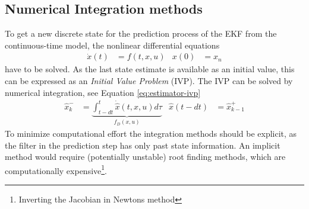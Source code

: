 \subsection{Numerical Integration methods}
\label{sec:numerical-integration}
To get a new discrete state for the prediction process of the EKF from the continuous-time model, the nonlinear differential equations 
\begin{align}
    \dot x(t) &= f(t, x, u) & x(0) &= x_{n} 
\end{align}
have to be solved. 
As the last state estimate is available as an initial value, this can be expressed as an \textit{Initial Value Problem} (IVP). 
The IVP can be solved by numerical integration, see Equation \ref{eq:estimator-ivp}
\begin{align}
     \hat x_k^- &= \underbrace{\int_{t-dt}^{t} \dot{\hat x}(t,x,u) d\tau}_{f_D(x,u)}
     &
     \hat x (t-dt) &= \hat x_{k-1}^+
\end{align}
To minimize computational effort the integration methods should be explicit, as the filter in the prediction step has only past state information. 
An implicit method would require (potentially unstable) root finding methods, which are computationally expensive\footnote{Inverting the Jacobian in Newtons method}.

